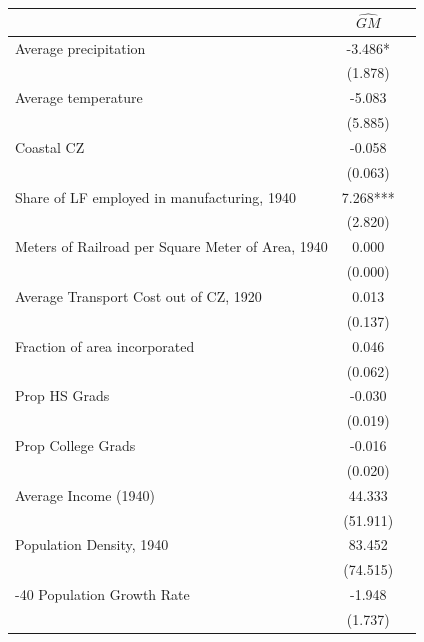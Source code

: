  \begin{tabular}{l*{2}{c}} \toprule
                &\multicolumn{1}{c}{$\widehat{GM}$}\\
\midrule
Average precipitation&   -3.486*  \\
                &  (1.878)   \\
\addlinespace
Average temperature&   -5.083   \\
                &  (5.885)   \\
\addlinespace
Coastal CZ      &   -0.058   \\
                &  (0.063)   \\
\addlinespace
Share of LF employed in manufacturing, 1940&    7.268***\\
                &  (2.820)   \\
\addlinespace
Meters of Railroad per Square Meter of Area, 1940&    0.000   \\
                &  (0.000)   \\
\addlinespace
Average Transport Cost out of CZ, 1920&    0.013   \\
                &  (0.137)   \\
\addlinespace
Fraction of area incorporated&    0.046   \\
                &  (0.062)   \\
\addlinespace
Prop HS Grads   &   -0.030   \\
                &  (0.019)   \\
\addlinespace
Prop College Grads&   -0.016   \\
                &  (0.020)   \\
\addlinespace
Average Income (1940)&   44.333   \\
                & (51.911)   \\
\addlinespace
Population Density, 1940&   83.452   \\
                & (74.515)   \\
\addlinespace
1930-40 Population Growth Rate&   -1.948   \\
                &  (1.737)   \\
       \bottomrule \end{tabular}
